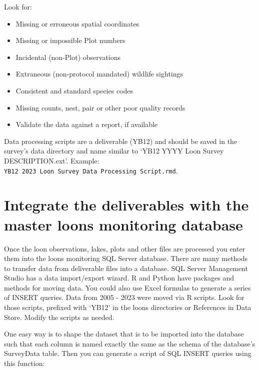 \documentclass[
  letterpaper,
  DIV=11,
  numbers=noendperiod]{scrreprt}
\begin{document}
Look for:

\begin{itemize}
\item
  Missing or erroneous spatial coordinates
\item
  Missing or impossible Plot numbers
\item
  Incidental (non-Plot) observations
\item
  Extraneous (non-protocol mandated) wildlife sightings
\item
  Consistent and standard species codes
\item
  Missing counts, nest, pair or other poor quality records
\item
  Validate the data against a report, if available
\end{itemize}

Data processing scripts are a deliverable (YB12) and should be saved in
the survey's data directory and name similar to `YB12 YYYY Loon Survey
DESCRIPTION.ext'. Example:
\texttt{YB12\ 2023\ Loon\ Survey\ Data\ Processing\ Script.rmd}.

\section{Integrate the deliverables with the master loons monitoring
database}\label{integrate-the-deliverables-with-the-master-loons-monitoring-database}

Once the loon observations, lakes, plots and other files are processed
you enter them into the loons monitoring SQL Server database. There are
many methods to transfer data from deliverable files into a database.
SQL Server Management Studio has a data import/export wizard. R and
Python have packages and methods for moving data. You could also use
Excel formulas to generate a series of INSERT queries. Data from 2005 -
2023 were moved via R scripts. Look for those scripts, prefixed with
`YB12' in the loons directories or References in Data Store. Modify the
scripts as needed.

One easy way is to shape the dataset that is to be imported into the
database such that each column is named exactly the same as the schema
of the database's SurveyData table. Then you can generate a script of
SQL INSERT queries using this function:
\end{document}
